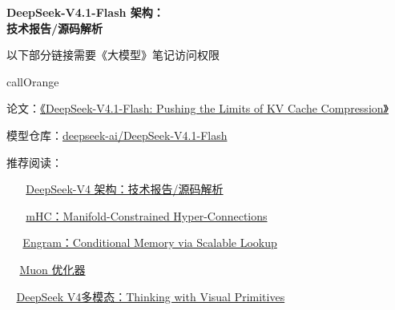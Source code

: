 \documentclass[zihao=false,fontset=windows]{ctexart}
\newcommand{\feiEmoji}[1]{{\emojifont #1}}
\begin{document}
{\bfseries DeepSeek-V4.1-Flash 架构：\\技术报告/源码解析\par}

\begin{feishuquote}

以下部分链接需要《大模型》笔记访问权限\par
\end{feishuquote}

\begin{feishubox}{callOrange}{📌}

论文：\href{https://www.alphaxiv.org/pdf/2609.deepseek-v4-1-flash}{《DeepSeek-V4.1-Flash: Pushing the Limits of KV Cache Compression》}\par

模型仓库：\href{https://huggingface.co/deepseek-ai/DeepSeek-V4.1-Flash}{deepseek-ai/DeepSeek-V4.1-Flash}\par

推荐阅读：\par

\feiEmoji{🌟}\feiEmoji{🌟}\feiEmoji{🌟}\feiEmoji{🌟}\feiEmoji{🌟} \href{https://my.feishu.cn/wiki/UsuawakRYiqacxkD9vxcKzylnoe}{DeepSeek-V4 架构：技术报告/源码解析}\par

\feiEmoji{🌟}\feiEmoji{🌟}\feiEmoji{🌟}\feiEmoji{🌟}\feiEmoji{🌟} \href{https://scnajei2ds6y.feishu.cn/wiki/WsaawrdO3ifrmTk3ab4cSgjBnRb}{mHC：Manifold-Constrained Hyper-Connections}\par

\feiEmoji{🌟}\feiEmoji{🌟}\feiEmoji{🌟}\feiEmoji{🌟} \href{https://scnajei2ds6y.feishu.cn/wiki/JwXTw0oUeimyoBk2QIgcSfBfn9g}{Engram：Conditional Memory via Scalable Lookup}\par

\feiEmoji{🌟}\feiEmoji{🌟}\feiEmoji{🌟} \href{https://scnajei2ds6y.feishu.cn/wiki/Hcj2wGTJEiohTikkdEKc7H4Nnlb}{Muon 优化器}\par

\feiEmoji{🌟}\feiEmoji{🌟} \href{https://scnajei2ds6y.feishu.cn/docx/MVsAdBXHVoE6FyxG16Kc6ee9noc}{DeepSeek V4多模态：Thinking with Visual Primitives}\par
\end{feishubox}
\end{document}
